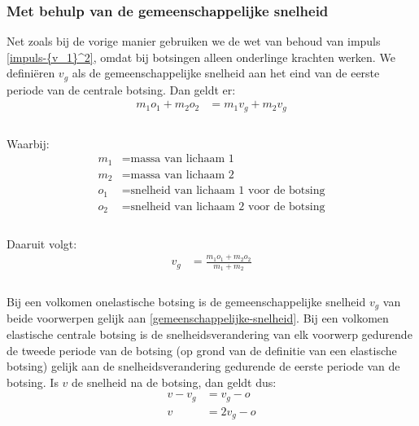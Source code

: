 \documentclass[12pt,a4paper]{article}
\begin{document}
	\subsubsection{Met behulp van de gemeenschappelijke snelheid}
	Net zoals bij de vorige manier gebruiken we de wet van behoud van impuls \eqref{impuls-{v_1}^2}, omdat bij botsingen alleen onderlinge krachten werken. We definiëren $v_g$ als de gemeenschappelijke snelheid  aan het eind van de eerste periode van de centrale botsing. Dan geldt er:
	\begin{equation}
		\begin{aligned}
			m_1o_1+m_2o_2&=m_1v_g+m_2v_g\\
		\end{aligned}
	\end{equation}
	\\Waarbij:
	\begin{equation}
		\begin{aligned}
			m_1 &= \text{massa van lichaam 1}\\
			m_2 &= \text{massa van lichaam 2}\\
			o_1 &= \text{snelheid van lichaam 1 voor de botsing}\\
			o_2 &= \text{snelheid van lichaam 2 voor de botsing}\\
		\end{aligned}
	\end{equation}
	\\Daaruit volgt:
	\begin{equation}
		\begin{aligned}
		\label{gemeenschappelijke-snelheid}
			v_g&=\frac{m_1o_1+m_2o_2}{m_1+m_2}\\
		\end{aligned}
	\end{equation}
	\\Bij een volkomen onelastische botsing is de gemeenschappelijke snelheid $v_g$ van beide voorwerpen gelijk aan \eqref{gemeenschappelijke-snelheid}. Bij een volkomen elastische centrale botsing is de snelheidsverandering van elk voorwerp gedurende de tweede periode van de botsing (op grond van de definitie van een elastische botsing) gelijk aan de snelheidsverandering gedurende de eerste periode van de botsing.
Is $v$ de snelheid na de botsing, dan geldt dus:
	\begin{equation}
		\begin{aligned}
			v-v_g&=v_g-o\\
			v&=2v_g-o\\
		\end{aligned}
	\end{equation}
\end{document}
